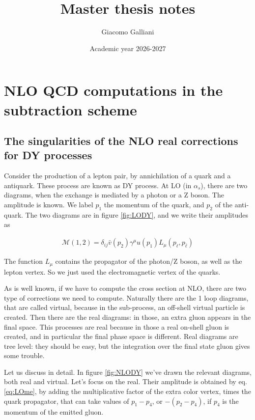 \documentclass[11pt]{report}
\title{\Huge{\textbf{Master thesis notes}}}
\author{Giacomo Galliani}
\date{Academic year 2026-2027}
\renewcommand{\contentsname}{Indice}
\begin{document}
\maketitle
\newpage%
\pdfbookmark[section]{\contentsname}{toc}
\tableofcontents
\pagebreak

\chapter{NLO QCD computations in the subtraction scheme}

\section{The singularities of the NLO real corrections for DY processes}

Consider the production of a lepton pair, by annichilation of a quark and a antiquark. These process are known as DY process. At LO (in \(\alpha_s\)), there are two diagrams, when the exchange is mediated by a photon or a Z boson. The amplitude is known. We label \(p_1\) the momentum of the quark, and \(p_2\) of the anti-quark. The two diagrams are in figure \ref{fig:LODY}, and we write their amplitudes as  

\begin{align}
    \label{eq:LOme}
    \mathcal{M}(1, 2) = \delta_{ij}\bar{v}(p_2)\gamma^\mu u(p_1)L_\mu(p_\ell, p_{\bar{\ell}})
\end{align}

The function \(L_\mu\) contains the propagator of the photon/Z boson, as well as the lepton vertex. So we just used the electromagnetic vertex of the quarks. 

As is well known, if we have to compute the cross section at NLO, there are two type of corrections we need to compute. Naturally there are the 1 loop diagrams, that are called virtual, because in the sub-process, an off-shell virtual particle is created. Then there are the real diagrams: in those, an extra gluon appears in the final space. This processes are real because in those a real on-shell gluon is created, and in particular the final phase space is different. Real diagrams are tree level: they should be easy, but the integration over the final state gluon gives some trouble. 

Let us discuss in detail. In figure \ref{fig:NLODY} we've drawn the relevant diagrams, both real and virtual. Let's focus on the real. Their amplitude is obtained by eq. \ref{eq:LOme}, by adding the multiplicative factor of the extra color vertex, times the quark propagator, that can take values of \(p_1 - p_4\), or \(-(p_2-p_4)\), if \(p_4\) is the momentum of the emitted gluon. 
\end{document}
